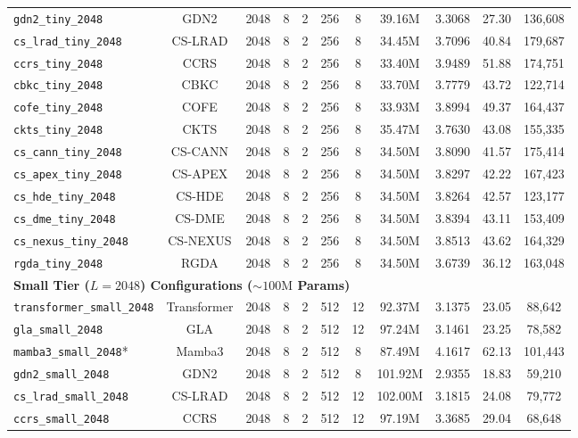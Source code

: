 \documentclass[twocolumn,10pt]{article}
\begin{document}
\begin{table}[!htbp]
{\begin{tabular}{lcccccccccc}
\texttt{gdn2\_tiny\_2048} & GDN2 & 2048 & 8 & 2 & 256 & 8 & 39.16M & 3.3068 & 27.30 & 136,608 \\
\texttt{cs\_lrad\_tiny\_2048} & CS-LRAD & 2048 & 8 & 2 & 256 & 8 & 34.45M & 3.7096 & 40.84 & 179,687 \\
\texttt{ccrs\_tiny\_2048} & CCRS & 2048 & 8 & 2 & 256 & 8 & 33.40M & 3.9489 & 51.88 & 174,751 \\
\texttt{cbkc\_tiny\_2048} & CBKC & 2048 & 8 & 2 & 256 & 8 & 33.70M & 3.7779 & 43.72 & 122,714 \\
\texttt{cofe\_tiny\_2048} & COFE & 2048 & 8 & 2 & 256 & 8 & 33.93M & 3.8994 & 49.37 & 164,437 \\
\texttt{ckts\_tiny\_2048} & CKTS & 2048 & 8 & 2 & 256 & 8 & 35.47M & 3.7630 & 43.08 & 155,335 \\
\texttt{cs\_cann\_tiny\_2048} & CS-CANN & 2048 & 8 & 2 & 256 & 8 & 34.50M & 3.8090 & 41.57 & 175,414 \\
\texttt{cs\_apex\_tiny\_2048} & CS-APEX & 2048 & 8 & 2 & 256 & 8 & 34.50M & 3.8297 & 42.22 & 167,423 \\
\texttt{cs\_hde\_tiny\_2048} & CS-HDE & 2048 & 8 & 2 & 256 & 8 & 34.50M & 3.8264 & 42.57 & 123,177 \\
\texttt{cs\_dme\_tiny\_2048} & CS-DME & 2048 & 8 & 2 & 256 & 8 & 34.50M & 3.8394 & 43.11 & 153,409 \\
\texttt{cs\_nexus\_tiny\_2048} & CS-NEXUS & 2048 & 8 & 2 & 256 & 8 & 34.50M & 3.8513 & 43.62 & 164,329 \\
\texttt{rgda\_tiny\_2048} & RGDA & 2048 & 8 & 2 & 256 & 8 & 34.50M & 3.6739 & 36.12 & 163,048 \\
\midrule
\multicolumn{11}{l}{\textbf{Small Tier ($L=2048$) Configurations ($\sim 100\text{M}$ Params)}} \\
\texttt{transformer\_small\_2048} & Transformer & 2048 & 8 & 2 & 512 & 12 & 92.37M & 3.1375 & 23.05 & 88,642 \\
\texttt{gla\_small\_2048} & GLA & 2048 & 8 & 2 & 512 & 12 & 97.24M & 3.1461 & 23.25 & 78,582 \\
\texttt{mamba3\_small\_2048}* & Mamba3 & 2048 & 8 & 2 & 512 & 8 & 87.49M & 4.1617 & 62.13 & 101,443 \\
\texttt{gdn2\_small\_2048} & GDN2 & 2048 & 8 & 2 & 512 & 8 & 101.92M & 2.9355 & 18.83 & 59,210 \\
\texttt{cs\_lrad\_small\_2048} & CS-LRAD & 2048 & 8 & 2 & 512 & 12 & 102.00M & 3.1815 & 24.08 & 79,772 \\
\texttt{ccrs\_small\_2048} & CCRS & 2048 & 8 & 2 & 512 & 12 & 97.19M & 3.3685 & 29.04 & 68,648 \\

\end{tabular}}
\end{table}
\end{document}

